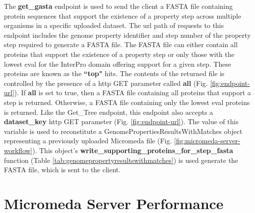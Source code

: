 The \textbf{get\_gasta} endpoint is used to send the client a FASTA file containing protein sequences that support the existence of a property step across multiple organisms in a specific uploaded dataset. The \gls{url} path of requests to this endpoint includes the genome property identifier and step number of the property step required to generate a FASTA file. The FASTA file can either contain all proteins that support the existence of a property step or only those with the lowest \gls{eval} for the InterPro domain offering support for a given step. These proteins are known as the \textbf{``top"} hits. The contents of the returned file is controlled by the presence of a \gls{http} GET parameter called \textbf{all} (Fig. \ref{fig:endpoint-url}). If \textbf{all} is set to true, then a FASTA file containing all proteins that support a step is returned. Otherwise, a FASTA file containing only the lowest \gls{eval} proteins is returned. Like the Get\_Tree endpoint, this endpoint also accepts a \textbf{dataset\_key} \gls{http} GET parameter (Fig. \ref{fig:endpoint-url}). The value of this variable is used to reconstitute a GenomePropertiesResultsWithMatches object representing a previously uploaded Micromeda file (Fig. \ref{fig:micromeda-server-workflow}). This object's \textbf{write\_supporting\_proteins\_for\_step\_fasta} function (Table \ref{tab:genomepropertyresultswithmatches}) is used generate the FASTA file, which is sent to the client.

\section{Micromeda Server Performance} \label{micromeda-server-performance}

